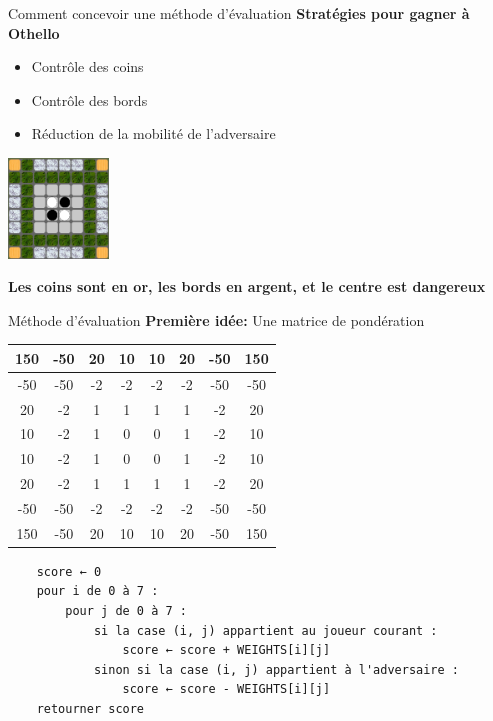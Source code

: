 \begin{frame}[t]{Comment concevoir une méthode d'évaluation}
    \textbf{Stratégies pour gagner à Othello}
    \begin{itemize}
        \item Contrôle des coins 
        \item Contrôle des bords 
        \item Réduction de la mobilité de l'adversaire
    \end{itemize}
    \begin{center}
        \includegraphics[width=0.2\textwidth]{img/eval_0.png}
    \end{center}
    \centering
    \textbf{Les coins sont en or, les bords en argent, et le centre est dangereux}
\end{frame}

\begin{frame}[t,fragile]{Méthode d'évaluation}
    \textbf{Première idée:}
    Une matrice de pondération
    \begin{table}[h!]
    \centering
    \begin{tabular}{|c|c|c|c|c|c|c|c|}
    \hline
    150 & -50 & 20 & 10 & 10 & 20 & -50 & 150 \\ \hline
    -50 & -50 & -2 & -2 & -2 & -2 & -50 & -50 \\ \hline
    20 & -2 & 1 & 1 & 1 & 1 & -2 & 20 \\ \hline
    10 & -2 & 1 & 0 & 0 & 1 & -2 & 10 \\ \hline
    10 & -2 & 1 & 0 & 0 & 1 & -2 & 10 \\ \hline
    20 & -2 & 1 & 1 & 1 & 1 & -2 & 20 \\ \hline
    -50 & -50 & -2 & -2 & -2 & -2 & -50 & -50 \\ \hline
    150 & -50 & 20 & 10 & 10 & 20 & -50 & 150 \\ \hline
    \end{tabular}
    \end{table}
    {\footnotesize
    \begin{verbatim}
    score ← 0
    pour i de 0 à 7 :
        pour j de 0 à 7 :
            si la case (i, j) appartient au joueur courant :
                score ← score + WEIGHTS[i][j]
            sinon si la case (i, j) appartient à l'adversaire :
                score ← score - WEIGHTS[i][j]
    retourner score
    \end{verbatim}
    }
\end{frame}


